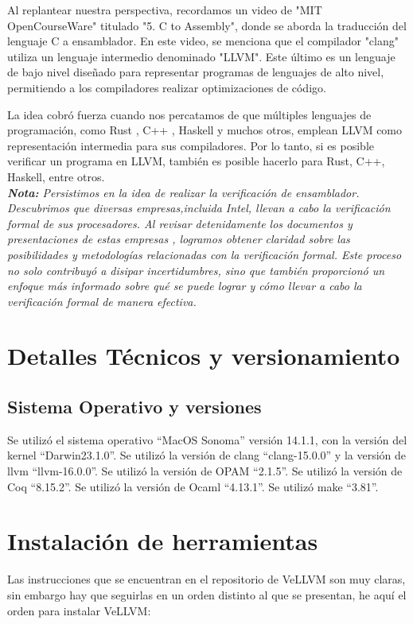 \documentclass{hw-template}
\begin{document}
Al replantear nuestra perspectiva, recordamos un video de "MIT OpenCourseWare"
titulado "5. C to Assembly", donde se aborda la traducción del lenguaje C a
ensamblador. En este video, se menciona que el compilador "clang" utiliza
un lenguaje intermedio denominado "LLVM". Este último es un lenguaje de bajo
nivel diseñado para representar programas de lenguajes de alto nivel,
permitiendo a los compiladores realizar optimizaciones de código.

La idea cobró fuerza cuando nos percatamos de que múltiples lenguajes de
programación, como Rust \cite{rust}, C++ \cite{cpp}, Haskell \cite{haskell}
y muchos otros, emplean LLVM como representación intermedia para sus
compiladores. Por lo tanto, si es posible verificar un programa en LLVM,
también es posible hacerlo para Rust, C++, Haskell, entre otros. \\

\textit{\textbf{Nota:} Persistimos en la idea de realizar la verificación
de ensamblador. Descubrimos que diversas empresas,incluida Intel,
llevan a cabo la verificación formal de sus procesadores. Al revisar
detenidamente los documentos y presentaciones de estas empresas
\cite{intel-verification}, logramos obtener claridad sobre las posibilidades
y metodologías relacionadas con la verificación formal. Este proceso no
solo contribuyó a disipar incertidumbres, sino que también proporcionó un
enfoque más informado sobre qué se puede lograr y cómo llevar a cabo la
verificación formal de manera efectiva.} 

\section{Detalles Técnicos y versionamiento}

\subsection{Sistema Operativo y versiones}
Se utilizó el sistema operativo ``MacOS Sonoma'' versión 14.1.1, con la
versión del kernel ``Darwin23.1.0''. Se utilizó la versión de clang 
``clang-15.0.0'' y la versión de llvm ``llvm-16.0.0''. Se utilizó la
versión de OPAM ``2.1.5''. Se utilizó la versión de Coq ``8.15.2''. Se
utilizó la versión de Ocaml ``4.13.1''.  Se utilizó make ``3.81''.

\section{Instalación de herramientas}
Las instrucciones que se encuentran en el repositorio de VeLLVM 
\cite{vellvm} son muy claras, sin embargo hay que seguirlas en un orden
distinto al que se presentan, he aquí el orden para instalar VeLLVM:
\end{document}
